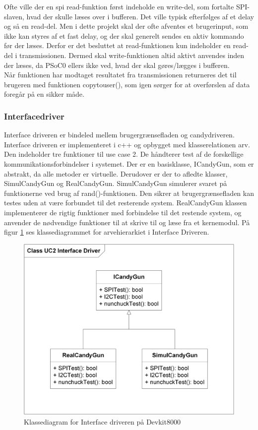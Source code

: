 Ofte ville der en spi read-funktion først indeholde en write-del, som fortalte SPI-slaven, hvad der skulle læses over i bufferen. Det ville typisk efterfølges af et delay og så en read-del. Men i dette projekt skal der ofte afventes et brugerinput, som ikke kan styres af et fast delay, og der skal generelt sendes en aktiv kommando før der læses. Derfor er det besluttet at read-funktionen kun indeholder en read-del i transmissionen. Dermed skal write-funktionen altid aktivt anvendes inden der læses, da PSoC0 ellers ikke ved, hvad der skal gøres/lægges i bufferen.\\
Når funktionen har modtaget resultatet fra transmissionen returneres det til brugeren med funktionen copy\textunderscore to\textunderscore user(), som igen sørger for at overførslen af data foregår på en sikker måde.



\subsubsection{Interfacedriver}
Interface driveren er bindeled mellem brugergrænsefladen og candydriveren. Interface driveren er implementeret i c++ og opbygget med klasserelationen arv. Den indeholder tre funktioner til use case 2. De håndterer test af de forskellige kommunikationsforbindelser i systemet. Der er en basisklasse, ICandyGun, som er abstrakt, da alle metoder er virtuelle. Derudover er der to afledte klasser, SimulCandyGun og RealCandyGun. SimulCandyGun simulerer svaret på funktionerne ved brug af rand()-funktionen. Den sikrer at brugergrænsefladen kan testes uden at være forbundet til det resterende system. RealCandyGun klassen implementerer de rigtig funktioner med forbindelse til det restende system, og anvender de nødvendige funktioner til at skrive til og læse fra et kernemodul. På figur \ref{fig:IDriverKlasseDiagram} ses klassediagrammet for arvehierarkiet i Interface Driveren. 

\begin{figure}[H]
	\centering
	\includegraphics[width=\textwidth]{DesignOgImplementering/images/IdriverKlasseDiagram}
	\caption{Klassediagram for Interface driveren på Devkit8000}
	\label{fig:IDriverKlasseDiagram}
\end{figure}

